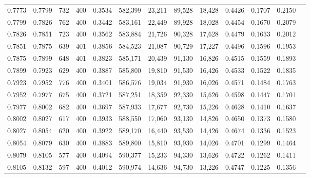 \begin{tabular}{rrrrrrrrrrrrr}
0.7773 & 0.7799 &    732 & 400 &                                     0.3534 & 582,399 &  23,211 &  89,528 &  18,428 & 0.4426 & 0.1707 & 0.2150 \\
0.7799 & 0.7826 &    762 & 400 &                                     0.3442 & 583,161 &  22,449 &  89,928 &  18,028 & 0.4454 & 0.1670 & 0.2079 \\
0.7826 & 0.7851 &    723 & 400 &                                     0.3562 & 583,884 &  21,726 &  90,328 &  17,628 & 0.4479 & 0.1633 & 0.2012 \\
0.7851 & 0.7875 &    639 & 401 &                                     0.3856 & 584,523 &  21,087 &  90,729 &  17,227 & 0.4496 & 0.1596 & 0.1953 \\
0.7875 & 0.7899 &    648 & 401 &                                     0.3823 & 585,171 &  20,439 &  91,130 &  16,826 & 0.4515 & 0.1559 & 0.1893 \\
0.7899 & 0.7923 &    629 & 400 &                                     0.3887 & 585,800 &  19,810 &  91,530 &  16,426 & 0.4533 & 0.1522 & 0.1835 \\
0.7923 & 0.7952 &    776 & 400 &                                     0.3401 & 586,576 &  19,034 &  91,930 &  16,026 & 0.4571 & 0.1484 & 0.1763 \\
0.7952 & 0.7977 &    675 & 400 &                                     0.3721 & 587,251 &  18,359 &  92,330 &  15,626 & 0.4598 & 0.1447 & 0.1701 \\
0.7977 & 0.8002 &    682 & 400 &                                     0.3697 & 587,933 &  17,677 &  92,730 &  15,226 & 0.4628 & 0.1410 & 0.1637 \\
0.8002 & 0.8027 &    617 & 400 &                                     0.3933 & 588,550 &  17,060 &  93,130 &  14,826 & 0.4650 & 0.1373 & 0.1580 \\
0.8027 & 0.8054 &    620 & 400 &                                     0.3922 & 589,170 &  16,440 &  93,530 &  14,426 & 0.4674 & 0.1336 & 0.1523 \\
0.8054 & 0.8079 &    630 & 400 &                                     0.3883 & 589,800 &  15,810 &  93,930 &  14,026 & 0.4701 & 0.1299 & 0.1464 \\
0.8079 & 0.8105 &    577 & 400 &                                     0.4094 & 590,377 &  15,233 &  94,330 &  13,626 & 0.4722 & 0.1262 & 0.1411 \\
0.8105 & 0.8132 &    597 & 400 &                                     0.4012 & 590,974 &  14,636 &  94,730 &  13,226 & 0.4747 & 0.1225 & 0.1356 \\

\end{tabular}
